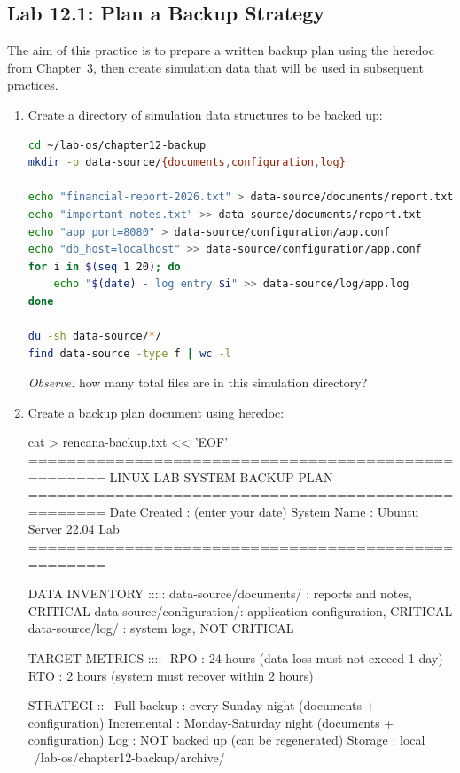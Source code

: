 \subsection*{Lab 12.1: Plan a Backup Strategy}

The aim of this practice is to prepare a written backup plan using the heredoc from Chapter~3, then create simulation data that will be used in subsequent practices.

\begin{enumerate}
\item Create a directory of simulation data structures to be backed up:
\begin{lstlisting}[language=bash, caption={Prepare directory and simulation data}]
cd ~/lab-os/chapter12-backup
mkdir -p data-source/{documents,configuration,log}

echo "financial-report-2026.txt" > data-source/documents/report.txt
echo "important-notes.txt" >> data-source/documents/report.txt
echo "app_port=8080" > data-source/configuration/app.conf
echo "db_host=localhost" >> data-source/configuration/app.conf
for i in $(seq 1 20); do
    echo "$(date) - log entry $i" >> data-source/log/app.log
done

du -sh data-source/*/
find data-source -type f | wc -l
\end{lstlisting}
\textit{Observe:} how many total files are in this simulation directory?

\item Create a backup plan document using heredoc:
\begin{longlisting}[language=bash, caption={Create a backup plan with heredoc}]
cat > rencana-backup.txt << 'EOF'
====================================================
LINUX LAB SYSTEM BACKUP PLAN
====================================================
Date Created   : (enter your date)
System Name    : Ubuntu Server 22.04 Lab
====================================================

DATA INVENTORY
:::::
data-source/documents/    : reports and notes, CRITICAL
data-source/configuration/: application configuration, CRITICAL
data-source/log/        : system logs, NOT CRITICAL

TARGET METRICS
::::-
RPO : 24 hours (data loss must not exceed 1 day)
RTO : 2 hours  (system must recover within 2 hours)

STRATEGI
::--
Full backup    : every Sunday night (documents + configuration)
Incremental    : Monday-Saturday night (documents + configuration)
Log            : NOT backed up (can be regenerated)
Storage        : local ~/lab-os/chapter12-backup/archive/


\end{longlisting}
\end{enumerate}
